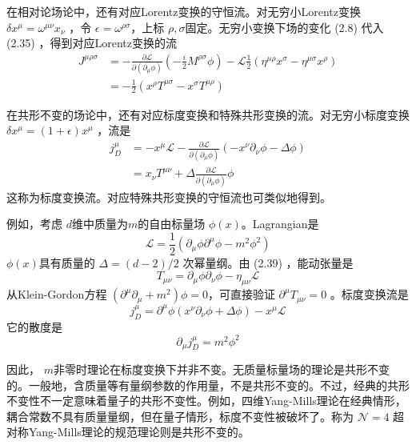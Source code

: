 在相对论场论中，还有对应Lorentz变换的守恒流。对无穷小Lorentz变换 $\delta x^{\mu}=\omega^{\mu \nu} x_{\nu}$ ，令 $\epsilon=\omega^{\rho \sigma} $，上标 $\rho,\sigma $固定。无穷小变换下场的变化 (2.8) 代入 (2.35) ，得到对应Lorentz变换的流
\begin{equation}
	\begin{aligned} J^{\mu \rho \sigma}&=-\frac{\partial \mathcal{L}}{\partial\left(\partial_{\mu} \phi\right)}\left(-\frac{i}{2} M^{\rho \sigma} \phi\right)-\mathcal{L} \frac{1}{2}\left(\eta^{\mu \rho} x^{\sigma}-\eta^{\mu \sigma} x^{\rho}\right)\\ &=-\frac{1}{2}\left(x^{\rho} T^{\mu \sigma}-x^{\sigma} T^{\mu \rho}\right) \end{aligned}
\end{equation}

在共形不变的场论中，还有对应标度变换和特殊共形变换的流。对无穷小标度变换 $\delta x^{\mu}=(1+\epsilon) x^{\mu}$ ，流是
\begin{equation}
	\begin{aligned} j_{D}^{\mu}&=-x^{\mu} \mathcal{L}-\frac{\partial \mathcal{L}}{\partial\left(\partial_{\mu} \phi\right)}\left(-x^{\nu} \partial_{\nu} \phi-\Delta \phi\right)\\&=x_{\nu} T^{\mu \nu}+\Delta \frac{\partial \mathcal{L}}{\partial\left(\partial_{\mu} \phi\right)} \phi \end{aligned}
\end{equation}
这称为标度变换流。对应特殊共形变换的守恒流也可类似地得到。

例如，考虑 $d $维中质量为$ m $的自由标量场 $\phi(x) $。Lagrangian是
\begin{equation}
\mathcal{L}=\frac{1}{2}\left(\partial_{\mu} \phi \partial^{\mu} \phi-m^{2} \phi^{2}\right)
\end{equation}
$\phi(x) $具有质量的 $\Delta=(d-2)/2$ 次幂量纲。由 (2.39) ，能动张量是
\begin{equation}
	T_{\mu \nu}=\partial_{\mu} \phi \partial_{\nu} \phi-\eta_{\mu \nu} \mathcal{L}
\end{equation}
从Klein-Gordon方程 $\left(\partial^{\mu} \partial_{\mu}+m^{2}\right) \phi=0 $，可直接验证 $\partial^{\mu} T_{\mu \nu}=0$ 。标度变换流是
\begin{equation}
	j_{D}^{\mu}=\partial^{\mu} \phi\left(x^{\nu} \partial_{\nu}\phi+\Delta \phi\right)-x^{\mu} \mathcal{L}
\end{equation}
它的散度是
\[\partial_{\mu} j_{D}^{\mu}=m^{2} \phi^{2}\]

因此， $m $非零时理论在标度变换下并非不变。无质量标量场的理论是共形不变的。一般地，含质量等有量纲参数的作用量，不是共形不变的。不过，经典的共形不变性不一定意味着量子的共形不变性。例如，四维Yang-Mills理论在经典情形，耦合常数不具有质量量纲，但在量子情形，标度不变性被破坏了。称为 $\mathcal{N}=4$ 超对称Yang-Mills理论的规范理论则是共形不变的。

